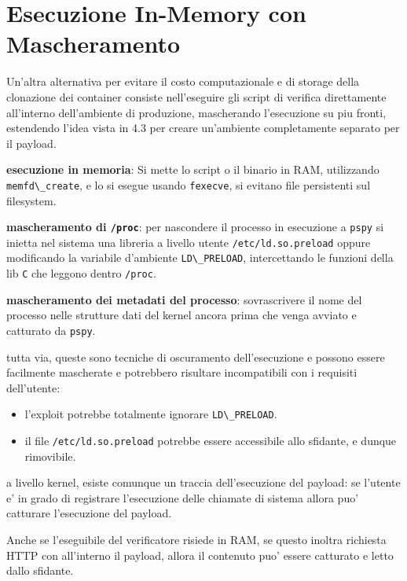 \section{Esecuzione In-Memory con
Mascheramento}\label{esecuzione-in-memory-con-mascheramento}

Un'altra alternativa per evitare il costo computazionale e di storage
della clonazione dei container consiste nell'eseguire gli script di
verifica direttamente all'interno dell'ambiente di produzione,
mascherando l'esecuzione su piu fronti, estendendo l'idea vista in 4.3
per creare un'ambiente completamente separato per il payload.

\textbf{esecuzione in memoria}: Si mette lo script o il binario in RAM,
utilizzando \passthrough{\lstinline!memfd\_create!}, e lo si esegue
usando \passthrough{\lstinline!fexecve!}, si evitano file persistenti
sul filesystem.

\textbf{mascheramento di \passthrough{\lstinline!/proc!}}: per
nascondere il processo in esecuzione a \passthrough{\lstinline!pspy!} si
inietta nel sistema una libreria a livello utente
\passthrough{\lstinline!/etc/ld.so.preload!} oppure modificando la
variabile d'ambiente \passthrough{\lstinline!LD\_PRELOAD!},
intercettando le funzioni della lib \passthrough{\lstinline!C!} che
leggono dentro \passthrough{\lstinline!/proc!}.

\textbf{mascheramento dei metadati del processo}: sovrascrivere il nome
del processo nelle strutture dati del kernel ancora prima che venga
avviato e catturato da \passthrough{\lstinline!pspy!}.

tutta via, queste sono tecniche di oscuramento dell'esecuzione e possono
essere facilmente mascherate e potrebbero risultare incompatibili con i
requisiti dell'utente:

\begin{itemize}
\tightlist
\item
  l'exploit potrebbe totalmente ignorare
  \passthrough{\lstinline!LD\_PRELOAD!}.
\item
  il file \passthrough{\lstinline!/etc/ld.so.preload!} potrebbe essere
  accessibile allo sfidante, e dunque rimovibile.
\end{itemize}

a livello kernel, esiste comunque un traccia dell'esecuzione del
payload: se l'utente e' in grado di registrare l'esecuzione delle
chiamate di sistema allora puo' catturare l'esecuzione del payload.

Anche se l'eseguibile del verificatore risiede in RAM, se questo inoltra
richiesta HTTP con all'interno il payload, allora il contenuto puo'
essere catturato e letto dallo sfidante.

